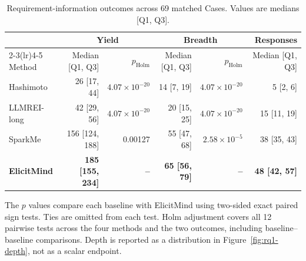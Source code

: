 \begin{table}[t]
\centering
\caption{Requirement-information outcomes across 69 matched Cases. Values are medians [Q1, Q3].}
\label{tab:rq1-results}
\small
\setlength{\tabcolsep}{4pt}
\begin{tabular}{lrrrrr}
\toprule
 & \multicolumn{2}{c}{Yield} & \multicolumn{2}{c}{Breadth} & Responses \\
\cmidrule(lr){2-3}\cmidrule(lr){4-5}
Method & Median [Q1, Q3] & $p_{\mathrm{Holm}}$ & Median [Q1, Q3] & $p_{\mathrm{Holm}}$ & Median [Q1, Q3] \\
\midrule
Hashimoto & 26 [17, 44] & $4.07\times10^{-20}$ & 14 [7, 19] & $4.07\times10^{-20}$ & 5 [2, 6] \\
LLMREI-long & 42 [29, 56] & $4.07\times10^{-20}$ & 20 [15, 25] & $4.07\times10^{-20}$ & 15 [11, 19] \\
SparkMe & 156 [124, 188] & 0.00127 & 55 [47, 68] & $2.58\times10^{-5}$ & 38 [35, 43] \\
\textbf{ElicitMind} & \textbf{185 [155, 234]} & \textbf{--} & \textbf{65 [56, 79]} & \textbf{--} & \textbf{48 [42, 57]} \\
\bottomrule
\end{tabular}
\par\smallskip
\begin{minipage}{\linewidth}\footnotesize
The $p$ values compare each baseline with ElicitMind using two-sided exact paired sign tests.
Ties are omitted from each test. Holm adjustment covers all 12 pairwise tests across
the four methods and the two outcomes, including baseline--baseline comparisons.
Depth is reported as a distribution in Figure~\ref{fig:rq1-depth}, not as a scalar endpoint.
\end{minipage}
\end{table}
